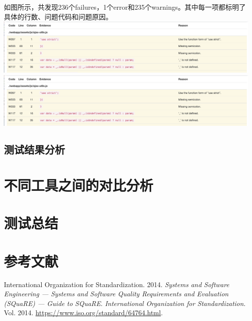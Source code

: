 \documentclass[hyperref, a4paper]{ctexart}
\begin{document}
如图所示，共发现236个failures，1个error和235个warnings。其中每一项都标明了具体的行数、问题代码和问题原因。
\includegraphics{screenshots/pic3.jpg}
\includegraphics{screenshots/pic3.jpg}

\hypertarget{ux6d4bux8bd5ux7ed3ux679cux5206ux6790-2}{%
\subsection{测试结果分析}\label{ux6d4bux8bd5ux7ed3ux679cux5206ux6790-2}}

\hypertarget{ux4e0dux540cux5de5ux5177ux4e4bux95f4ux7684ux5bf9ux6bd4ux5206ux6790}{%
\section{不同工具之间的对比分析}\label{ux4e0dux540cux5de5ux5177ux4e4bux95f4ux7684ux5bf9ux6bd4ux5206ux6790}}

\hypertarget{ux6d4bux8bd5ux603bux7ed3}{%
\section{测试总结}\label{ux6d4bux8bd5ux603bux7ed3}}

\pagebreak

\hypertarget{ux53c2ux8003ux6587ux732e}{%
\section*{参考文献}\label{ux53c2ux8003ux6587ux732e}}

\hypertarget{refs}{}
\leavevmode\hypertarget{ref-innovativeInternationalisation}{}%
International Organization for Standardization. 2014. \emph{Systems and
Software Engineering --- Systems and Software Quality Requirements and
Evaluation (SQuaRE) --- Guide to SQuaRE}. \emph{International
Organization for Standardization}. Vol. 2014.
\url{https://www.iso.org/standard/64764.html}.
\end{document}
